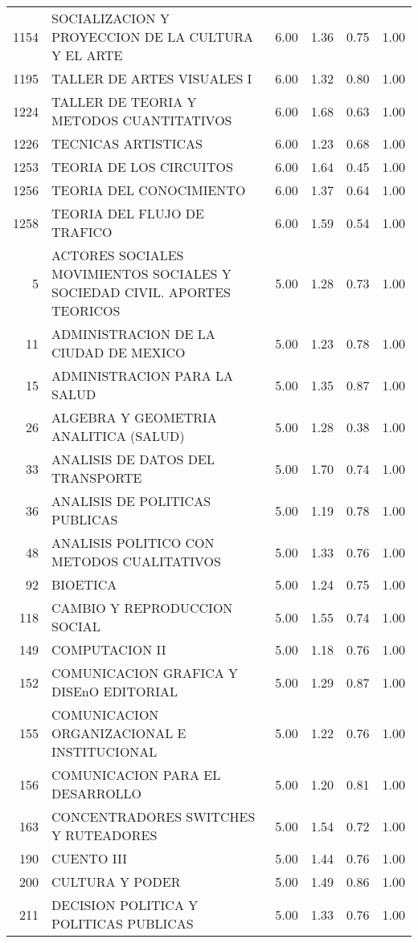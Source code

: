 \documentclass[12pt]{article}
\begin{document}
\begin{table}[ht]
\begin{tabular}{rlrrrr}
  1154 & SOCIALIZACION Y PROYECCION DE LA CULTURA Y EL ARTE & 6.00 & 1.36 & 0.75 & 1.00 \\ 
  1195 & TALLER DE ARTES VISUALES I & 6.00 & 1.32 & 0.80 & 1.00 \\ 
  1224 & TALLER DE TEORIA Y METODOS CUANTITATIVOS & 6.00 & 1.68 & 0.63 & 1.00 \\ 
  1226 & TECNICAS ARTISTICAS & 6.00 & 1.23 & 0.68 & 1.00 \\ 
  1253 & TEORIA DE LOS CIRCUITOS & 6.00 & 1.64 & 0.45 & 1.00 \\ 
  1256 & TEORIA DEL CONOCIMIENTO & 6.00 & 1.37 & 0.64 & 1.00 \\ 
  1258 & TEORIA DEL FLUJO DE TRAFICO & 6.00 & 1.59 & 0.54 & 1.00 \\ 
  5 & ACTORES SOCIALES MOVIMIENTOS SOCIALES Y SOCIEDAD CIVIL. APORTES TEORICOS & 5.00 & 1.28 & 0.73 & 1.00 \\ 
  11 & ADMINISTRACION DE LA CIUDAD DE MEXICO & 5.00 & 1.23 & 0.78 & 1.00 \\ 
  15 & ADMINISTRACION PARA LA SALUD & 5.00 & 1.35 & 0.87 & 1.00 \\ 
  26 & ALGEBRA Y GEOMETRIA ANALITICA (SALUD) & 5.00 & 1.28 & 0.38 & 1.00 \\ 
  33 & ANALISIS DE DATOS DEL TRANSPORTE & 5.00 & 1.70 & 0.74 & 1.00 \\ 
  36 & ANALISIS DE POLITICAS PUBLICAS & 5.00 & 1.19 & 0.78 & 1.00 \\ 
  48 & ANALISIS POLITICO CON METODOS CUALITATIVOS & 5.00 & 1.33 & 0.76 & 1.00 \\ 
  92 & BIOETICA & 5.00 & 1.24 & 0.75 & 1.00 \\ 
  118 & CAMBIO Y REPRODUCCION SOCIAL & 5.00 & 1.55 & 0.74 & 1.00 \\ 
  149 & COMPUTACION II & 5.00 & 1.18 & 0.76 & 1.00 \\ 
  152 & COMUNICACION GRAFICA Y DISEnO EDITORIAL & 5.00 & 1.29 & 0.87 & 1.00 \\ 
  155 & COMUNICACION ORGANIZACIONAL E INSTITUCIONAL & 5.00 & 1.22 & 0.76 & 1.00 \\ 
  156 & COMUNICACION PARA EL DESARROLLO & 5.00 & 1.20 & 0.81 & 1.00 \\ 
  163 & CONCENTRADORES SWITCHES Y RUTEADORES & 5.00 & 1.54 & 0.72 & 1.00 \\ 
  190 & CUENTO III & 5.00 & 1.44 & 0.76 & 1.00 \\ 
  200 & CULTURA Y PODER & 5.00 & 1.49 & 0.86 & 1.00 \\ 
  211 & DECISION POLITICA Y POLITICAS PUBLICAS & 5.00 & 1.33 & 0.76 & 1.00 \\ 

\end{tabular}
\end{table}
\end{document}
